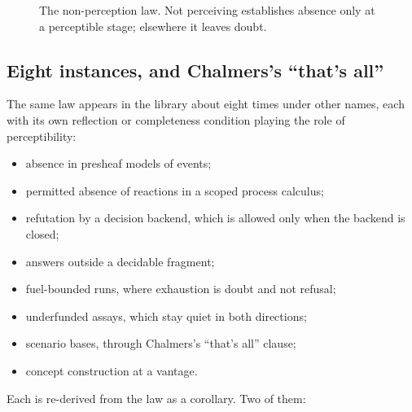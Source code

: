\documentclass[11pt]{article}
\theoremstyle{plain}
\theoremstyle{definition}
\begin{document}
\begin{figure}[ht]
\centering
{}
\caption{The non-perception law. Not perceiving establishes absence only at a perceptible
stage; elsewhere it leaves doubt.}
\label{fig:nonperception}
\end{figure}

\subsection{Eight instances, and Chalmers's ``that's all''}

The same law appears in the library about eight times under other names, each with its own
reflection or completeness condition playing the role of perceptibility:
\begin{itemize}
\item absence in presheaf models of events;
\item permitted absence of reactions in a scoped process calculus;
\item refutation by a decision backend, which is allowed only when the backend is closed;
\item answers outside a decidable fragment;
\item fuel-bounded runs, where exhaustion is doubt and not refusal;
\item underfunded assays, which stay quiet in both directions;
\item scenario bases, through Chalmers's ``that's all'' clause;
\item concept construction at a vantage.
\end{itemize}
\noindent Each is re-derived from the law as a corollary. Two of them:
\end{document}
